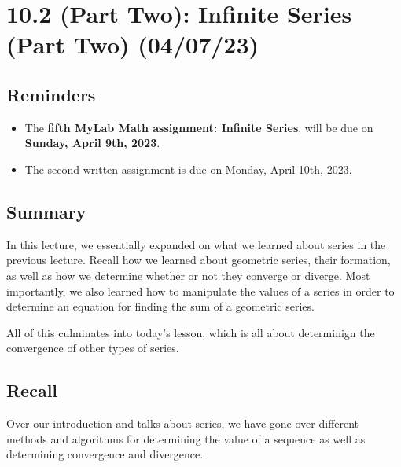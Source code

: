 \documentclass{report}
\begin{document}
\begin{sloppypar}
\chapter{10.2 (Part Two): Infinite Series (Part Two) (04/07/23)}
\section{Reminders}
\begin{itemize}
  \item The \textbf{fifth MyLab Math assignment: Infinite Series}, will be due on
        \textbf{Sunday, April 9th, 2023}.

  \item The second written assignment is due on {Monday, April 10th, 2023}.
\end{itemize}
\section{Summary}
In this lecture, we essentially expanded on what we learned about series in the previous
lecture.
Recall how we learned about geometric series, their formation, as well as how we
determine whether or not they converge or diverge. Most importantly, we also
learned how to manipulate the values of a series in order to determine
an equation for finding the sum of a geometric series.
\par All of this culminates into today's lesson, which is all about
determinign the convergence of other types of series.
\section{Recall}
Over our introduction and talks about series, we have gone over
different methods and algorithms for determining the value of a
sequence as well as determining convergence and divergence.

\end{sloppypar}
\end{document}
